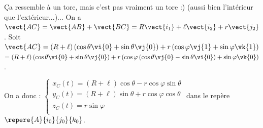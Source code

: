 \begin{corrigebox}
Ça ressemble à un tore, mais c'est pas vraiment un tore :) (aussi bien l'intérieur que l'extérieur...)...
On a $\vect{AC}=\vect{AB}+\vect{BC} = R\vect{i_1} + \ell\vect{i_2}+r\vect{j_2}$. 
Soit $\vect{AC} = \left(R+\ell\right)\left(\cos\theta\vi{0} + \sin\theta\vj{0}\right)  + r\left(\cos\varphi \vj{1}+\sin\varphi \vk{1}\right)$  $= \left(R+\ell\right)\left(\cos\theta\vi{0} + \sin\theta\vj{0}\right)  + r\left(\cos\varphi \left(  \cos\theta\vj{0} - \sin\theta\vi{0}\right)+\sin\varphi \vk{0}\right)$.

On a donc :
$\left\{
\begin{array}{l}
x_C(t)= \left(R+\ell\right)\cos\theta  - r\cos\varphi  \sin\theta\\
y_C(t)= \left(R+\ell\right)\sin\theta  + r\cos\varphi \cos\theta \\
z_C(t)=  r\sin\varphi \\
\end{array}
\right.
$ dans le repère $\repere{A}{i_0}{j_0}{k_0}$.
\end{corrigebox}
